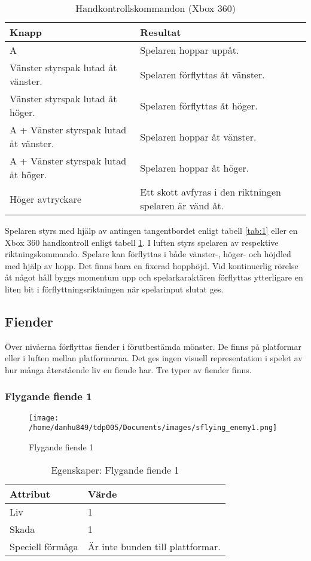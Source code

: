 \documentclass{TDP005mall}
\begin{document}
\begin{table}[h!]
  \caption{Handkontrollskommandon (Xbox 360)\label{tab:2}}
\begin{tabular}{|l|l|}
\hline
Knapp & Resultat \\\hline
A & Spelaren hoppar uppåt. \\\hline
Vänster styrspak lutad åt vänster.  & Spelaren förflyttas åt vänster. \\\hline
Vänster styrspak lutad åt höger. & Spelaren förflyttas åt höger. \\\hline
A + Vänster styrspak lutad åt vänster. & Spelaren hoppar åt vänster. \\\hline
A + Vänster styrspak lutad åt höger. & Spelaren hoppar åt höger. \\\hline
Höger avtryckare & Ett skott avfyras i den riktningen spelaren är vänd åt. \\\hline
\end{tabular}
\end{table}

Spelaren styrs med hjälp av antingen tangentbordet enligt tabell \ref{tab:1} eller en Xbox 360 handkontroll enligt tabell \ref{tab:2}. I luften styrs spelaren av respektive riktningskommando. Spelare kan förflyttas i både vänster-, höger- och höjdled med hjälp av hopp. Det finns bara en fixerad hopphöjd. Vid kontinuerlig rörelse åt något håll byggs momentum upp och spelarkaraktären förflyttas ytterligare en liten bit i förflyttningsriktningen när spelarinput slutat ges.

\subsection{Fiender}
Över nivåerna förflyttas fiender i förutbestämda mönster. De finns på platformar eller i luften mellan platformarna. Det ges ingen visuell representation i spelet av hur många återstående liv en fiende har. Tre typer av fiender finns.

\subsubsection*{Flygande fiende 1}
\begin{figure}[h!]
  \caption{Flygande fiende 1\label{fig:1}}
  \texttt{[image: /home/danhu849/tdp005/Documents/images/sflying\_enemy1.png]}
\end{figure}

\begin{table}[h!]
  \caption{Egenskaper: Flygande fiende 1\label{tab:3}}
\begin{tabular}{|l|l|}
\hline
Attribut & Värde \\\hline
Liv & 1 \\\hline
Skada & 1 \\\hline
Speciell förmåga & Är inte bunden till plattformar. \\\hline
\end{tabular}
\end{table}
\end{document}
